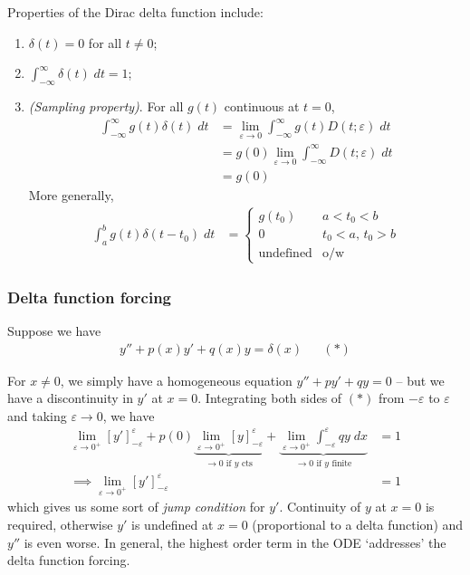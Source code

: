\documentclass{../../template/note}
\begin{document}
    Properties of the Dirac delta function include:
    \begin{enumerate}[label=\protect\circled{\arabic*}]
        \item \(\delta(t) = 0\) for all \(t \neq 0\);
        \item \(\int_{-\infty}^\infty \delta(t) \; dt = 1\);
        \item \emph{(Sampling property)}. For all \(g(t)\) continuous at \(t = 0\),
        \begin{align*}
            \int_{-\infty}^\infty g(t) \delta(t) \; dt &= \lim_{\varepsilon \to 0} \int_{-\infty}^\infty g(t) D(t; \varepsilon) \; dt \\
            &= g(0) \lim_{\varepsilon \to 0} \int_{-\infty}^\infty D(t; \varepsilon) \; dt \\
            &= g(0)
        \end{align*}
        More generally,
        \begin{align*}
            \int_a^b g(t) \delta(t - t_0) \; dt &= \begin{cases}
                g(t_0) & a < t_0 < b \\
                0 & t_0 < a,\, t_0 > b \\
                \text{undefined} & \text{o/w}
            \end{cases}
        \end{align*}
    \end{enumerate}
    
    \subsubsection{Delta function forcing}

    Suppose we have
    \begin{align*}
        y'' + p(x) y' + q(x) y = \delta(x) && (*)
    \end{align*}
    
    For \(x \neq 0\), we simply have a homogeneous equation \(y'' + py' + qy = 0\) -- but we have a discontinuity in \(y'\) at \(x = 0\). Integrating both sides of \((*)\) from \(-\varepsilon\) to \(\varepsilon\) and taking \(\varepsilon \to 0\), we have
    \begin{align*}
        \lim_{\varepsilon \to 0^+} [y']_{-\varepsilon}^{\varepsilon} + p(0) \underbrace{\lim_{\varepsilon \to 0^+} [y]_{-\varepsilon}^{\varepsilon}}_{\to 0 \text{ if } y \text{ cts}} + \underbrace{\lim_{\varepsilon \to 0^+} \int_{-\varepsilon}^{\varepsilon} qy \; dx}_{\to 0 \text{ if } y \text{ finite}} &= 1 \\
        \implies \lim_{\varepsilon \to 0^+} [y']_{-\varepsilon}^{\varepsilon} &= 1
    \end{align*}
    which gives us some sort of \emph{jump condition} for \(y'\). Continuity of \(y\) at \(x=0\) is required, otherwise \(y'\) is undefined at \(x=0\) (proportional to a delta function) and \(y''\) is even worse. In general, the highest order term in the ODE `addresses' the delta function forcing.
    
\end{document}
